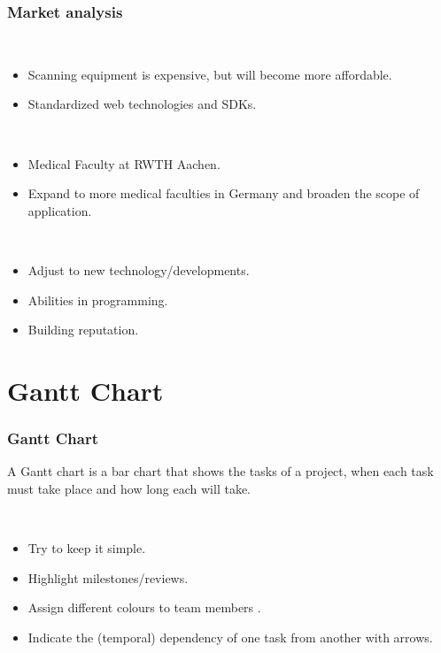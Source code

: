 \begin{frame}
  \frametitle{Market analysis}
      \begin{description}[]
        \item[Industry cost structure] \hfill \\
        \begin{itemize}
          \item Scanning equipment is expensive, but will become more affordable.
          \item Standardized web technologies and SDKs.
        \end{itemize}

        \item[Distribution Channels] \hfill \\
          \begin{itemize}
            \item Medical Faculty at RWTH Aachen.
            \item Expand to more medical faculties in Germany and  broaden the scope of application.
        \end{itemize}

\item[Key Success Factors] \hfill \\
          \begin{itemize}
            \item Adjust to new technology/developments.
           \item Abilities in programming.
	\item Building reputation.
\end{itemize}
\end{description}
\end{frame}

\section{Gantt Chart}

\begin{frame}
  \frametitle{Gantt Chart}
A Gantt chart is a bar chart that shows the tasks of a project, when each task must take place and how long each will take.  
  \begin{description}[]
	\item[Conventions] \hfill \\
	\begin{itemize}
	\item Try to keep it simple.
          \item Highlight milestones/reviews.
        \item Assign different colours to team members .
        \item Indicate the (temporal) dependency of one task from another with arrows.
      \end{itemize}
 \end{description}
\end{frame}


